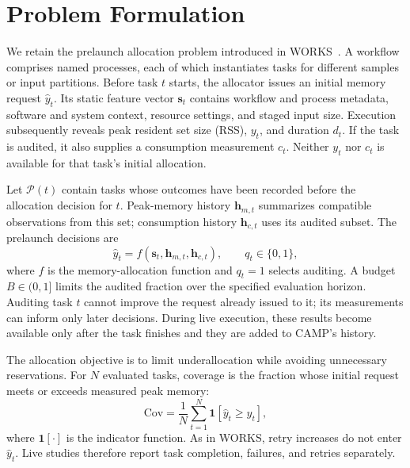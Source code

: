 \section{Problem Formulation}
\label{sec:problem}
We retain the prelaunch allocation problem introduced in
WORKS~\cite{camp2026works}. A workflow comprises named processes, each of
which instantiates tasks for different samples or input partitions.
Before task $t$ starts, the allocator issues an initial memory request
$\hat y_t$. Its static feature vector $\mathbf{s}_t$ contains workflow and
process metadata, software and system context, resource settings, and
staged input size. Execution subsequently reveals peak resident set size
(RSS), $y_t$, and duration $d_t$. If the task is audited, it also supplies a
consumption measurement $c_t$. Neither $y_t$ nor $c_t$ is available for that
task's initial allocation.

Let $\mathcal{P}(t)$ contain tasks whose outcomes have been recorded before
the allocation decision for $t$. Peak-memory history $\mathbf{h}_{m,t}$
summarizes compatible observations from this set; consumption history
$\mathbf{h}_{c,t}$ uses its audited subset. The prelaunch decisions are
\begin{equation}
\hat y_t=f(\mathbf{s}_t,\mathbf{h}_{m,t},\mathbf{h}_{c,t}),
\qquad q_t\in\{0,1\},
\label{eq:allocation_problem}
\end{equation}
where $f$ is the memory-allocation function and $q_t=1$ selects auditing.
A budget $B\in(0,1]$ limits the audited
fraction over the specified evaluation horizon. Auditing task $t$ cannot
improve the request already issued to it; its measurements can inform
only later decisions. During live execution, these results become
available only after the task finishes and they are added to CAMP's
history.

The allocation objective is to limit underallocation while avoiding
unnecessary reservations. For $N$ evaluated tasks, coverage is the
fraction whose initial request meets or exceeds measured peak memory:
\begin{equation}
\mathrm{Cov}=\frac{1}{N}\sum_{t=1}^{N}\mathbf{1}[\hat y_t\geq y_t],
\label{eq:coverage}
\end{equation}
where $\mathbf{1}[\cdot]$ is the indicator function. As in WORKS, retry
increases do not enter $\hat y_t$. Live studies therefore
report task completion, failures, and retries separately.

